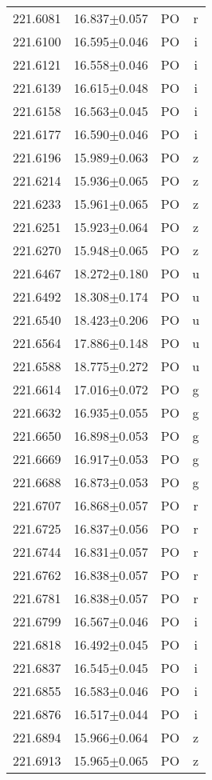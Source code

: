 \begin{table}
\begin{tabular}{cccc}
221.6081 & 16.837$\pm$0.057 & PO & r \\
221.6100 & 16.595$\pm$0.046 & PO & i \\
221.6121 & 16.558$\pm$0.046 & PO & i \\
221.6139 & 16.615$\pm$0.048 & PO & i \\
221.6158 & 16.563$\pm$0.045 & PO & i \\
221.6177 & 16.590$\pm$0.046 & PO & i \\
221.6196 & 15.989$\pm$0.063 & PO & z \\
221.6214 & 15.936$\pm$0.065 & PO & z \\
221.6233 & 15.961$\pm$0.065 & PO & z \\
221.6251 & 15.923$\pm$0.064 & PO & z \\
221.6270 & 15.948$\pm$0.065 & PO & z \\
221.6467 & 18.272$\pm$0.180 & PO & u \\
221.6492 & 18.308$\pm$0.174 & PO & u \\
221.6540 & 18.423$\pm$0.206 & PO & u \\
221.6564 & 17.886$\pm$0.148 & PO & u \\
221.6588 & 18.775$\pm$0.272 & PO & u \\
221.6614 & 17.016$\pm$0.072 & PO & g \\
221.6632 & 16.935$\pm$0.055 & PO & g \\
221.6650 & 16.898$\pm$0.053 & PO & g \\
221.6669 & 16.917$\pm$0.053 & PO & g \\
221.6688 & 16.873$\pm$0.053 & PO & g \\
221.6707 & 16.868$\pm$0.057 & PO & r \\
221.6725 & 16.837$\pm$0.056 & PO & r \\
221.6744 & 16.831$\pm$0.057 & PO & r \\
221.6762 & 16.838$\pm$0.057 & PO & r \\
221.6781 & 16.838$\pm$0.057 & PO & r \\
221.6799 & 16.567$\pm$0.046 & PO & i \\
221.6818 & 16.492$\pm$0.045 & PO & i \\
221.6837 & 16.545$\pm$0.045 & PO & i \\
221.6855 & 16.583$\pm$0.046 & PO & i \\
221.6876 & 16.517$\pm$0.044 & PO & i \\
221.6894 & 15.966$\pm$0.064 & PO & z \\
221.6913 & 15.965$\pm$0.065 & PO & z \\

\end{tabular}
\end{table}

